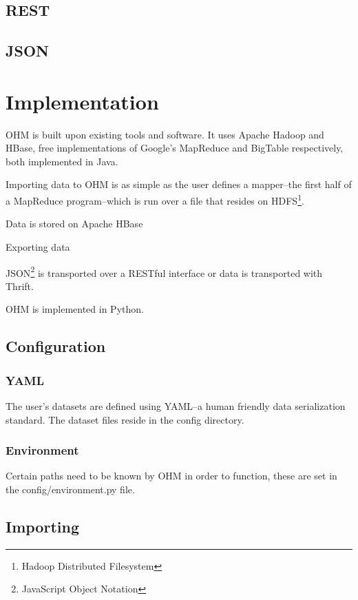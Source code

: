 \documentclass[a4paper,10pt]{book}
\begin{document}
\section{REST}

\section{JSON}



\chapter{Implementation}

OHM is built upon existing tools and software. It uses Apache Hadoop and
HBase, free implementations of Google's MapReduce and BigTable
respectively, both implemented in Java.

Importing data to OHM is as simple as the user defines a mapper--the first
half of a MapReduce program--which is run over a file that resides on
HDFS\footnote{Hadoop Distributed Filesystem}.

Data is stored on Apache HBase

Exporting data

JSON\footnote{JavaScript Object Notation} is transported over a RESTful
interface or data is transported with Thrift.

OHM is implemented in Python.



\section{Configuration}

\subsection{YAML}

The user's datasets are defined using YAML--a human friendly data
serialization standard. The dataset files reside in the config directory.


\subsection{Environment}

Certain paths need to be known by OHM in order to function, these are set
in the config/environment.py file.



\section{Importing}
\end{document}
